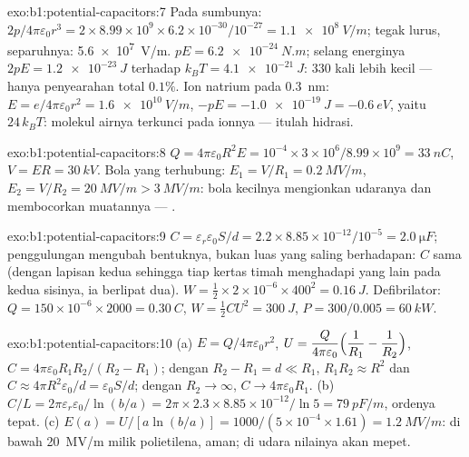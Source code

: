 \begin{solution}{exo:b1:potential-capacitors:7}
Pada sumbunya: $2p/4\pi\varepsilon_0r^3 = 2 \times 8.99 \times 10^9 \times 6.2 \times 10^{-30}/10^{-27} =
\qty{1.1e8}{V/m}$; tegak lurus, separuhnya: \qty{5.6e7}{V/m}.  $pE =
\qty{6.2e-24}{N.m}$; selang energinya $2pE = \qty{1.2e-23}{J}$ terhadap $k_BT =
\qty{4.1e-21}{J}$: $330$ kali lebih kecil --- hanya penyearahan total $0.1\%$.
Ion natrium pada \qty{0.3}{nm}: $E = e/4\pi\varepsilon_0r^2 = \qty{1.6e10}{V/m}$, $-pE
= \qty{-1.0e-19}{J} = \qty{-0.6}{eV}$, yaitu $24\,k_BT$: molekul airnya terkunci
pada ionnya --- itulah hidrasi.
\end{solution}

\begin{solution}{exo:b1:potential-capacitors:8}
$Q = 4\pi\varepsilon_0R^2E = 10^{-4} \times 3 \times 10^6/8.99 \times 10^9 = \qty{33}{nC}$,
$V = ER = \qty{30}{kV}$. Bola yang terhubung: $E_1 = V/R_1 = \qty{0.2}{MV/m}$,
$E_2 = V/R_2 = \qty{20}{MV/m} > \qty{3}{MV/m}$: bola kecilnya mengionkan
udaranya dan membocorkan muatannya --- .
\end{solution}

\begin{solution}{exo:b1:potential-capacitors:9}
$C = \varepsilon_r\varepsilon_0S/d = 2.2 \times 8.85 \times 10^{-12}/10^{-5} = \qty{2.0}{\micro F}$;
penggulungan mengubah bentuknya, bukan luas yang saling berhadapan: $C$ sama (dengan
lapisan kedua sehingga tiap kertas timah menghadapi yang lain pada kedua sisinya, ia
berlipat dua). $W = \tfrac12 \times 2 \times 10^{-6} \times 400^2 = \qty{0.16}{J}$. Defibrilator:
$Q = 150 \times 10^{-6} \times 2000 = \qty{0.30}{C}$, $W = \tfrac12CU^2 = \qty{300}{J}$,
$P = 300/0.005 = \qty{60}{kW}$.
\end{solution}

\begin{solution}{exo:b1:potential-capacitors:10}
(a) $E = Q/4\pi\varepsilon_0r^2$, $U = \dfrac{Q}{4\pi\varepsilon_0}\Bigl(\dfrac1{R_1} -
\dfrac1{R_2}\Bigr)$, $C = 4\pi\varepsilon_0R_1R_2/(R_2 - R_1)$; dengan $R_2 - R_1 = d \ll
R_1$, $R_1R_2 \approx R^2$ dan $C \approx 4\pi R^2\varepsilon_0/d = \varepsilon_0S/d$; dengan $R_2 \to
\infty$, $C \to 4\pi\varepsilon_0R_1$. (b) $C/L = 2\pi\varepsilon_r\varepsilon_0/\ln(b/a) = 2\pi \times 2.3
\times 8.85 \times 10^{-12}/\ln5 = \qty{79}{pF/m}$, ordenya tepat. (c) $E(a) =
U/[a\ln(b/a)] = 1000/(5 \times 10^{-4} \times 1.61) = \qty{1.2}{MV/m}$: di bawah
\qty{20}{MV/m} milik polietilena, aman; di udara nilainya akan mepet.
\end{solution}

